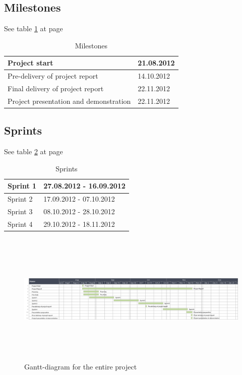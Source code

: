 \subsection*{Milestones}
See table \ref{tab:milestones} at page \pageref{tab:milestones}
\begin{table}
\begin{tabular}{l|l}
Project start &  21.08.2012\\ \hline
Pre-delivery of project report & 14.10.2012\\ \hline
Final delivery of project report & 22.11.2012\\ \hline
Project presentation and demonstration & 22.11.2012
\end{tabular}
\caption{Milestones} \label{tab:milestones}
\end{table}

\subsection*{Sprints}
See table \ref{tab:sprints} at page \pageref{tab:sprints}
\begin{table}
\begin{tabular}{l|l}
Sprint 1 &  27.08.2012 - 16.09.2012\\ \hline
Sprint 2 & 17.09.2012 - 07.10.2012\\ \hline
Sprint 3 & 08.10.2012 - 28.10.2012\\ \hline
Sprint 4 & 29.10.2012 - 18.11.2012
\end{tabular}
\caption{Sprints} \label{tab:sprints}
\end{table}

\begin{figure}[htb]
\begin{center}
\includegraphics[width=\textwidth, height=2.5in]{foo}
\caption{Gantt-diagram for the entire project}
\end{center}
\end{figure}